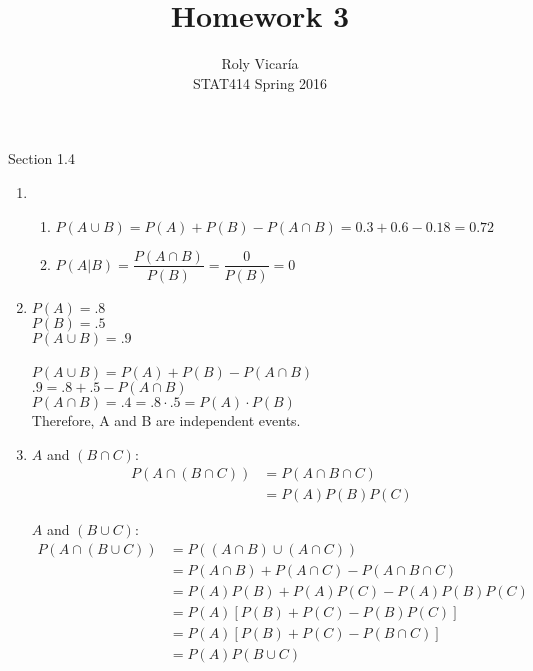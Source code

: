 \documentclass{article}
\title{Homework 3}
\author{Roly Vicar\'ia \\ STAT414 Spring 2016}
\begin{document}
    
    \maketitle
    
    Section 1.4
    \begin{enumerate}
     
     \addtocounter{enumi}{1}
     
     \item 
      \begin{enumerate}
       \item $P(A \cup B) = P(A) + P(B) - P(A \cap B) = 0.3 + 0.6 - 0.18 = 0.72$
       \item $P(A | B) = \dfrac{P(A \cap B)}{P(B)} = \dfrac{0}{P(B)} = 0$
      \end{enumerate}

     \addtocounter{enumi}{2}
     
     \item 
      $P(A) = .8$ \\
      $P(B) = .5$ \\
      $P(A \cup B) = .9$ \\
      \\
      $P(A \cup B) = P(A) + P(B) - P(A \cap B)$ \\
      $.9 = .8 + .5 - P(A \cap B)$ \\
      $P(A \cap B) = .4 = .8 \cdot .5 = P(A)\cdot P(B)$\\
      Therefore, A and B are independent events.

      \item 
	$A$ and $(B \cap C)$: \\
	\begin{align*}
	 P(A \cap (B \cap C)) &= P(A \cap B \cap C) \\
	  &= P(A)P(B)P(C)
	\end{align*}
	
	
	$A$ and $(B \cup C)$: \\
	\begin{align*}
	 P(A \cap (B \cup C)) &= P((A \cap B) \cup (A \cap C)) \\
	  &= P(A \cap B) + P(A \cap C) - P(A \cap B \cap C) \\
	  &= P(A)P(B) + P(A)P(C) - P(A)P(B)P(C) \\
	  &= P(A)[P(B) + P(C) - P(B)P(C)] \\
	  &= P(A)[P(B) + P(C) - P(B \cap C)] \\
	  &= P(A)P(B \cup C)
	\end{align*}


\end{enumerate}
\end{document}
